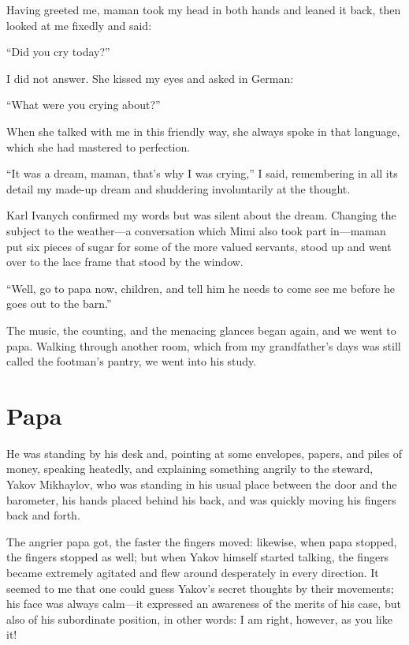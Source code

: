 Having greeted me, maman took my head in both hands and leaned it back, then looked at me fixedly and said:

``Did you cry today?'' %

I did not answer. She kissed my eyes and asked in German:

``What were you crying about?'' %

When she talked with me in this friendly way, she always spoke in that language, which she had mastered to perfection.

``It was a dream, maman, that's why I was crying,'' I said, remembering in all its detail my made-up dream and shuddering involuntarily at the thought. %

Karl Ivanych confirmed my words but was silent about the dream. Changing the subject to the weather---a conversation which Mimi also took part in---maman put six pieces of sugar for some of the more valued servants, stood up and went over to the lace frame that stood by the window.

``Well, go to papa now, children, and tell him he needs to come see me before he goes out to the barn.'' %

The music, the counting, and the menacing glances began again, and we went to papa. Walking through another room, which from my grandfather's days was still called the footman's pantry, we went into his study.

\chapter{Papa}

He was standing by his desk and, pointing at some envelopes, papers, and piles of money, speaking heatedly, and explaining something angrily to the steward, Yakov Mikhaylov, who was standing in his usual place between the door and the barometer, his hands placed behind his back, and was quickly moving his fingers back and forth.

The angrier papa got, the faster the fingers moved: likewise, when papa stopped, the fingers stopped as well; but when Yakov himself started talking, the fingers became extremely agitated and flew around desperately in every direction. It seemed to me that one could guess Yakov's secret thoughts by their movements; his face was always calm---it expressed an awareness of the merits of his case, but also of his subordinate position, in other words: I am right, however, as you like it!

